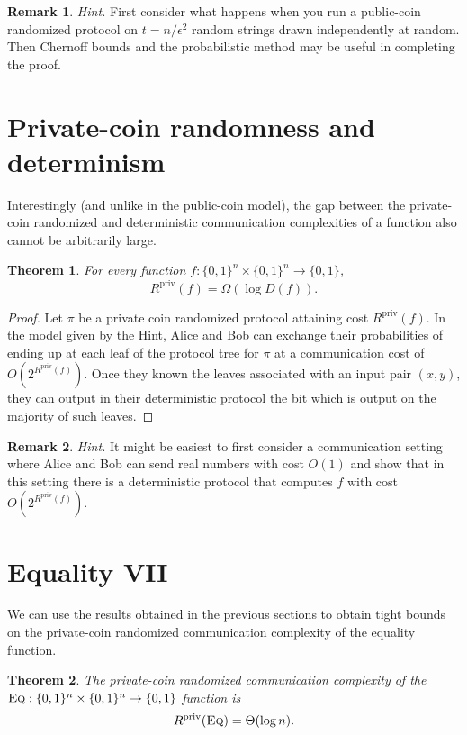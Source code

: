 \documentclass[11pt]{amsart}
\theoremstyle{plain}
\newtheorem{theorem}{Theorem}
\theoremstyle{definition}
\newtheorem{remark}{Remark}
\theoremstyle{plain}
\newcommand{\Eq}{\textsc{Eq}}
\newcommand{\Rpriv}{R^{\mathrm{priv}}}
\begin{document}
\bigskip
\begin{remark}
\emph{Hint.} First consider what happens when you run a public-coin randomized protocol on $t = n/\epsilon^2$ random strings drawn independently at random. Then Chernoff bounds and the probabilistic method may be useful in completing the proof.
\end{remark}


\newpage 
\section{Private-coin randomness and determinism}

Interestingly (and unlike in the public-coin model), the gap between the private-coin randomized and deterministic communication complexities of a function also cannot be arbitrarily large. 

\begin{theorem}
For every function $f : \{0,1\}^n \times \{0,1\}^n \to \{0,1\}$,
\[
\Rpriv(f) = \Omega( \log D(f)).
\]
\end{theorem}

\begin{proof}
Let $\pi$ be a private coin randomized protocol attaining cost $\Rpriv(f)$. In the model given by the Hint, Alice and Bob can exchange their probabilities of ending up at each leaf of the protocol tree for $\pi$ at a communication cost of $O(2^{\Rpriv(f)})$. Once they known the leaves associated with an input pair $(x,y)$, they can output in their deterministic protocol the bit which is output on the majority of such leaves.
\end{proof}

\bigskip
\begin{remark}
\emph{Hint.} It might be easiest to first consider a communication setting where Alice and Bob can send real numbers with cost $O(1)$ and show that in this setting there is a deterministic protocol that computes $f$ with cost $O(2^{\Rpriv(f)})$.
\end{remark}

\newpage 
\section{Equality VII}

We can use the results obtained in the previous sections to obtain tight bounds on the private-coin randomized communication complexity of the equality function.

\begin{theorem}
The private-coin randomized communication complexity of the $\Eq : \{0,1\}^n \times \{0,1\}^n \to \{0,1\}$ function is
\[
\Rpriv(\Eq) = \Theta( \log n).
\]
\end{theorem}
\end{document}
